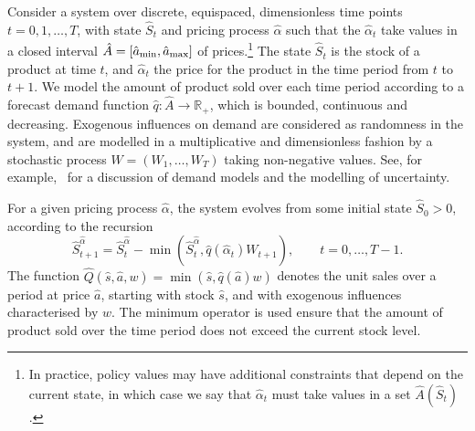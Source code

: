 \documentclass[main.tex]{subfiles}
\begin{document}
Consider a system over discrete, equispaced, dimensionless time points
$t=0,1,\dots,T$, with state
$\hat{S}_t$ and pricing process $\hat{\alpha}$ such that the $\hat{\alpha}_t$ take values in a closed
interval $\hat{A}=\nobreak[\hat{a}_{\mathrm{min}},\hat{a}_{\mathrm{max}}]$ of prices.\footnote{In
  practice, policy values may have additional constraints that depend
  on the current state,
  in which case we say that $\hat{\alpha}_t$ must take values
  in a set $\hat{A}(\hat{S}_t)$.
}
The state $\hat{S}_t$ is the stock of a product at time $t$, and
$\hat{\alpha}_t$ the price for the product in the time period from $t$ to
$t+1$. We model the amount of product sold over each time period according
to a forecast demand
function $\hat{q}:\hat{A}\to\mathbb R_+$, which is bounded, continuous and decreasing.
Exogenous influences on demand are considered as randomness in the
system, and are
modelled in a multiplicative and dimensionless fashion by a stochastic process
$W=(W_1,\dots,W_T)$ taking non-negative values. See, for
example,~\citet[Ch.~7]{talluri2006theory} for a discussion of
demand models and the modelling of uncertainty.

For a given pricing process $\hat{\alpha}$, the
system evolves from some initial state $\hat{S}_0>0$, according to the
recursion
\begin{equation}\label{eq:stock_dynamics}
  \hat{S}_{t+1}^{\hat{\alpha}}=\hat{S}_t^{\hat{\alpha}}-\min(\hat{S}_t^{\hat{\alpha}},\hat{q}(\hat{\alpha}_t)W_{t+1}),\qquad t=0,\dots,T-1.
\end{equation}
The function $\hat{Q}(\hat{s},\hat{a},w)=\min(\hat{s},\hat{q}(\hat{a})w)$ denotes the unit sales over a
period at price $\hat{a}$,
starting with stock $\hat{s}$, and with exogenous influences
characterised by $w$. The minimum operator is used ensure that the
amount of product sold over the time period does not exceed the
current stock level.
\end{document}
